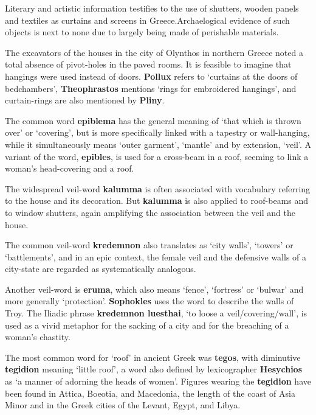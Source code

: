 Literary and artistic information testifies to the use of shutters, wooden panels and textiles as curtains and screens in Greece.Archaelogical evidence of such objects is next to none due to largely being made of perishable materials.

The excavators of the houses in the city of Olynthos in northern Greece noted a total absence of pivot-holes in the paved rooms. It is feasible to imagine that hangings were used instead of doors. \textbf{Pollux} refers to `curtains at the doors of bedchambers', \textbf{Theophrastos} mentions `rings for embroidered hangings', and curtain-rings are also mentioned by \textbf{Pliny}.

\begin{nte}
    The common word \textbf{epiblema} has the general meaning of `that which is thrown over' or `covering', but is more specifically linked with a tapestry or wall-hanging, while it simultaneously means `outer garment', `mantle' and by extension, `veil'. A variant of the word, \textbf{epibles}, is used for a cross-beam in a roof, seeming to link a woman's head-covering and a roof.
\end{nte}

The widespread veil-word \textbf{kalumma} is often associated with vocabulary referring to the house and its decoration. But \textbf{kalumma} is also applied to roof-beams and to window shutters, again amplifying the association between the veil and the house.

\begin{rmk}
    The common veil-word \textbf{kredemnon} also translates as `city walls', `towers' or `battlements', and in an epic context, the female veil and the defensive walls of a city-state are regarded as systematically analogous.
\end{rmk}

Another veil-word is \textbf{eruma}, which also means `fence', `fortress' or `bulwar' and more generally `protection'. \textbf{Sophokles} uses the word to describe the walls of Troy. The Iliadic phrase \textbf{kredemnon luesthai}, `to loose a veil/covering/wall', is used as a vivid metaphor for the sacking of a city and for the breaching of a woman's chastity.

The most common word for `roof' in ancient Greek was \textbf{tegos}, with diminutive \textbf{tegidion} meaning `little roof', a word also defined by lexicographer \textbf{Hesychios} as `a manner of adorning the heads of women'. Figures wearing the \textbf{tegidion} have been found in Attica, Boeotia, and Macedonia, the length of the coast of Asia Minor and in the Greek cities of the Levant, Egypt, and Libya.

